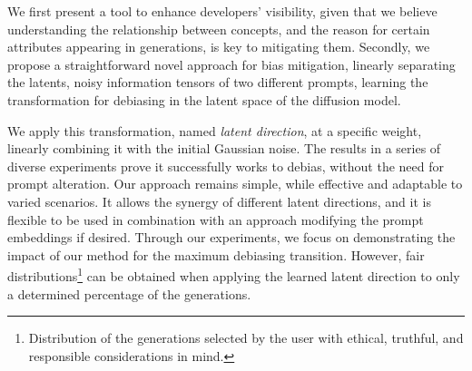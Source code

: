 
We first present a tool to enhance developers’ visibility, given that we believe understanding the relationship between concepts, and the reason for certain attributes appearing in generations, is key to mitigating them. Secondly, we propose a straightforward novel approach for bias mitigation, linearly separating the latents, noisy information tensors of two different prompts, learning the transformation for debiasing in the latent space of the diffusion model. 

We apply this transformation, named \textit{latent direction}, at a specific weight, linearly combining it with the initial Gaussian noise. The results in a series of diverse experiments prove it successfully works to debias, without the need for prompt alteration. Our approach remains simple, while effective and adaptable to varied scenarios. It allows the synergy of different latent directions, and it is flexible to be used in combination with an approach modifying the prompt embeddings if desired. Through our experiments, we focus on demonstrating the impact of our method for the maximum debiasing transition. However, fair distributions\footnote{Distribution of the generations selected by the user with ethical, truthful, and responsible considerations in mind.} can be obtained when applying the learned latent direction to only a determined percentage of the generations.
 
